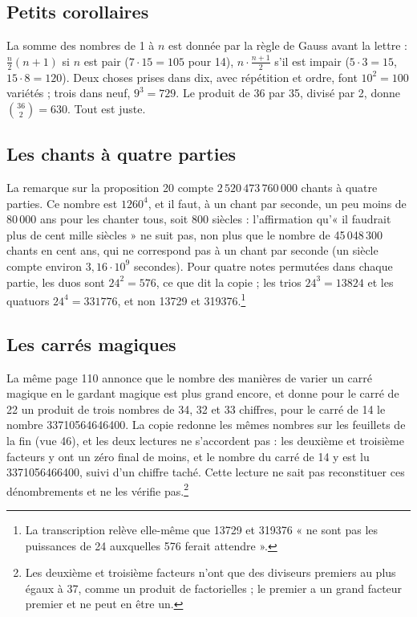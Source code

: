 \documentclass[11pt,a4paper]{article}
\begin{document}
\subsection*{Petits corollaires}

La somme des nombres de 1 à $n$ est donnée par la règle de Gauss avant la
lettre : $\frac{n}{2}(n+1)$ si $n$ est pair ($7 \cdot 15 = 105$ pour 14),
$n \cdot \frac{n+1}{2}$ s'il est impair ($5 \cdot 3 = 15$, $15 \cdot 8 = 120$).
Deux choses prises dans dix, avec répétition et ordre, font $10^2 = 100$
variétés ; trois dans neuf, $9^3 = 729$. Le produit de 36 par 35, divisé par 2,
donne $\binom{36}{2} = 630$. Tout est juste.

\subsection*{Les chants à quatre parties}

La remarque sur la proposition 20 compte $2\,520\,473\,760\,000$ chants à quatre
parties. Ce nombre est $1260^4$, et il faut, à un chant par seconde, un peu moins
de 80\,000 ans pour les chanter tous, soit 800 siècles : l'affirmation qu'« il
faudrait plus de cent mille siècles » ne suit pas, non plus que le nombre de
45\,048\,300 chants en cent ans, qui ne correspond pas à un chant par seconde
(un siècle compte environ $3{,}16 \cdot 10^9$ secondes). Pour quatre notes
permutées dans chaque partie, les duos sont $24^2 = 576$, ce que dit la copie ;
les trios $24^3 = 13824$ et les quatuors $24^4 = 331776$, et non 13729 et
319376.\footnote{La transcription relève elle-même que 13729 et 319376 « ne sont
pas les puissances de 24 auxquelles 576 ferait attendre ».}

\subsection*{Les carrés magiques}

La même page 110 annonce que le nombre des manières de varier un carré magique
en le gardant magique est plus grand encore, et donne pour le carré de 22 un
produit de trois nombres de 34, 32 et 33 chiffres, pour le carré de 14 le
nombre 33710564646400. La copie redonne les mêmes nombres sur les feuillets de la
fin (vue 46), et les deux lectures ne s'accordent pas : les deuxième et
troisième facteurs y ont un zéro final de moins, et le nombre du carré de 14 y
est lu 3371056466400, suivi d'un chiffre taché. Cette lecture ne sait pas
reconstituer ces dénombrements et ne les vérifie pas.\footnote{Les deuxième et
troisième facteurs n'ont que des diviseurs premiers au plus égaux à 37, comme un
produit de factorielles ; le premier a un grand facteur premier et ne peut en
être un.}
\end{document}
